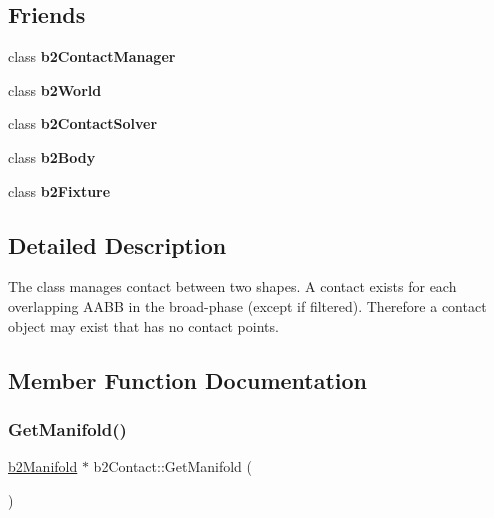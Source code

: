 \subsection*{Friends}
\begin{DoxyCompactItemize}
\item 
\mbox{\label{classb2_contact_aece264d42f69aed410f5eb3beba6ddf2}} 
class {\bfseries b2\+Contact\+Manager}
\item 
\mbox{\label{classb2_contact_a4bd536c5a7c0587913765bbc2693ceea}} 
class {\bfseries b2\+World}
\item 
\mbox{\label{classb2_contact_afb788a7ba90344f3ddbafff3de0465c4}} 
class {\bfseries b2\+Contact\+Solver}
\item 
\mbox{\label{classb2_contact_a010ab52de250e5fe30a45d642f46405b}} 
class {\bfseries b2\+Body}
\item 
\mbox{\label{classb2_contact_afb35b0e61f6ee3cc516c40ea251f3236}} 
class {\bfseries b2\+Fixture}
\end{DoxyCompactItemize}


\subsection{Detailed Description}
The class manages contact between two shapes. A contact exists for each overlapping A\+A\+BB in the broad-\/phase (except if filtered). Therefore a contact object may exist that has no contact points. 

\subsection{Member Function Documentation}
\mbox{\label{classb2_contact_ab0597077b23615476327f9b32d9c4979}} 
\subsubsection{\texorpdfstring{Get\+Manifold()}{GetManifold()}}
{\footnotesize\ttfamily \hyperlink{structb2_manifold}{b2\+Manifold} $\ast$ b2\+Contact\+::\+Get\+Manifold (\begin{DoxyParamCaption}{ }\end{DoxyParamCaption})\hspace{0.3cm}{\ttfamily [inline]}}

